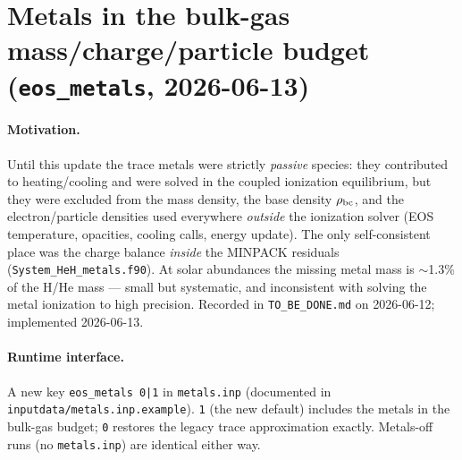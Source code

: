 \documentclass[english,a4paper]{kiseon_memo}
\begin{document}
\section{Metals in the bulk-gas mass/charge/particle budget (\texttt{eos\_metals}, 2026-06-13)}

\paragraph{Motivation.} Until this update the trace metals were strictly
\emph{passive} species: they contributed to heating/cooling and were solved in
the coupled ionization equilibrium, but they were excluded from the mass
density, the base density $\rho_{\rm bc}$, and the electron/particle densities
used everywhere \emph{outside} the ionization solver (EOS temperature,
opacities, cooling calls, energy update). The only self-consistent place was
the charge balance \emph{inside} the MINPACK residuals
(\texttt{System\_HeH\_metals.f90}). At solar abundances the missing metal mass
is $\sim$1.3\% of the H/He mass --- small but systematic, and inconsistent with
solving the metal ionization to high precision. Recorded in
\texttt{TO\_BE\_DONE.md} on 2026-06-12; implemented 2026-06-13.

\paragraph{Runtime interface.} A new key \texttt{eos\_metals 0|1} in
\texttt{metals.inp} (documented in \texttt{inputdata/metals.inp.example}).
\texttt{1} (the new default) includes the metals in the bulk-gas budget;
\texttt{0} restores the legacy trace approximation exactly. Metals-off runs
(no \texttt{metals.inp}) are identical either way.
\end{document}
